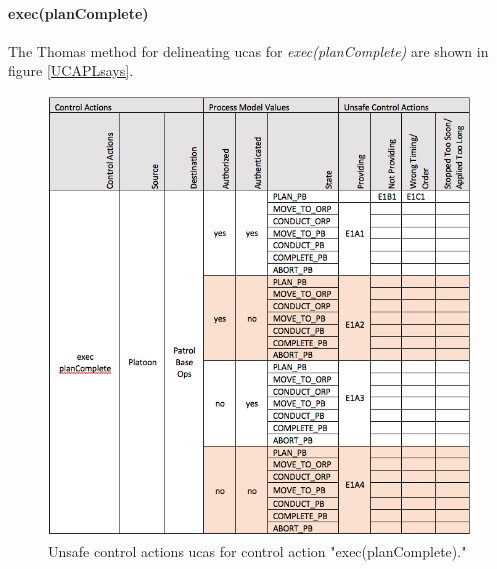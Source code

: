 \documentclass[../../main/main.tex]{subfiles}
\begin{document}
\clearpage
\paragraph*{exec(planComplete)}
The Thomas method for delineating \glspl{uca} for \textit{exec(planComplete)} are shown in figure \ref{UCAPLsays}.
\begin{figure}[ht!]
\begin{center}
\includegraphics[width=\linewidth]{../figures/UCAexecplan}
\caption{Unsafe control actions \glspl{uca} for control action "exec(planComplete)."}
\label{UCAexecplan}
\end{center}
\end{figure}

\clearpage
\end{document}
